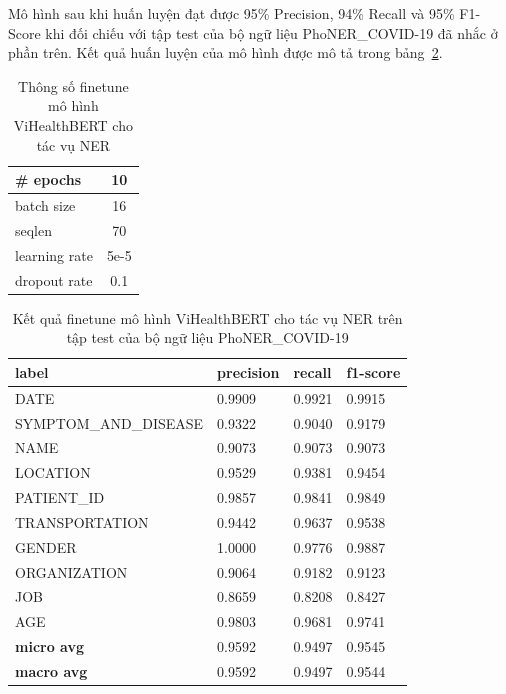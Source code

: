 Mô hình sau khi huấn luyện đạt được 95\% Precision, 94\% Recall và 95\% F1-Score khi đối chiếu với tập test của bộ ngữ liệu PhoNER\_COVID-19 đã nhắc ở phần trên. Kết quả huấn luyện của mô hình được mô tả trong bảng~\ref{tab:results-test}.
\begin{table}
\centering
\begin{tabular}{|l|c|}
\hline
\# epochs & 10 \\
\hline
batch size & 16 \\
\hline
seqlen & 70 \\
\hline
learning rate & 5e-5 \\
\hline
dropout rate & 0.1 \\
\hline
\end{tabular}
\caption{Thông số finetune mô hình ViHealthBERT cho tác vụ NER}
\label{tab:configurations}
\end{table}

\begin{table}
\centering
\begin{tabular}{|l|l|l|l|}
\hline
\textbf{label}        & \textbf{precision} & \textbf{recall} & \textbf{f1-score} \\ \hline
DATE                  & 0.9909             & 0.9921          & 0.9915            \\ \hdashline
SYMPTOM\_AND\_DISEASE & 0.9322             & 0.9040          & 0.9179            \\ \hdashline
NAME                  & 0.9073             & 0.9073          & 0.9073            \\ \hdashline
LOCATION              & 0.9529             & 0.9381          & 0.9454            \\ \hdashline
PATIENT\_ID           & 0.9857             & 0.9841          & 0.9849            \\ \hdashline
TRANSPORTATION        & 0.9442             & 0.9637          & 0.9538            \\ \hdashline
GENDER                & 1.0000             & 0.9776          & 0.9887            \\ \hdashline
ORGANIZATION          & 0.9064             & 0.9182          & 0.9123            \\ \hdashline
JOB                   & 0.8659             & 0.8208          & 0.8427            \\ \hdashline
AGE                   & 0.9803             & 0.9681          & 0.9741            \\ \hline
\textbf{micro avg}    & 0.9592             & 0.9497          & 0.9545            \\ \hline
\textbf{macro avg}    & 0.9592             & 0.9497          & 0.9544            \\ \hline
\end{tabular}
\caption{Kết quả finetune mô hình ViHealthBERT cho tác vụ NER trên tập test của bộ ngữ liệu PhoNER\_COVID-19}
\label{tab:results-test}
\end{table}

